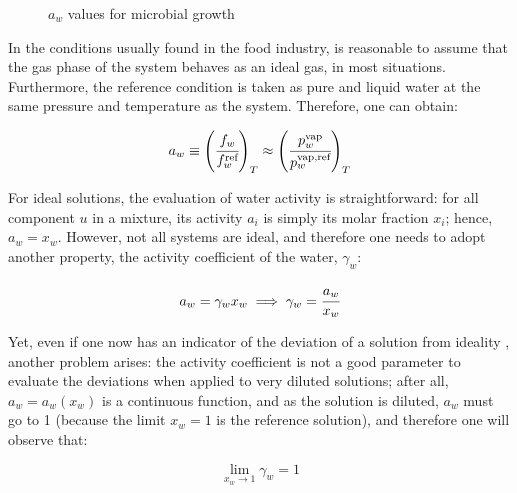 \documentclass[
	12pt,				%
	openright,
	twoside,
	a4paper,			%
	brazil,			%
	french,				%
	english				%
	]{abntex2}
\begin{document}
\begin{figure}[h]
	\caption{$a_w$ values for microbial growth}
	\label{fig:germ}
\end{figure}

In the conditions usually found in the food industry, is reasonable to assume
that the gas phase of the system behaves as an ideal gas\cite{canovas2007},
in most situations. Furthermore, the reference condition is taken as pure and liquid
water at the same pressure and temperature as the system. Therefore, one can obtain:

\begin{equation}
	\label{eq:def_atv}
	a_w \equiv \left(\cfrac{f_w}{f^\text{ref}_w}\right)_T%
		\approx \left(\cfrac{p^\text{vap}_w}{p^\text{vap,ref}_w}\right)_T
\end{equation}

For ideal solutions, the evaluation of water activity is straightforward: for all
component $u$ in a mixture, its activity $a_i$ is simply its molar fraction $x_i$;
hence, $a_w = x_w$. However, not all systems are ideal, and therefore one needs to
adopt another property, the activity coefficient of the water, $\gamma_w$:

\begin{equation}
	a_w = \gamma_wx_w \implies \gamma_w = \cfrac{a_w}{x_w}
\end{equation}

Yet, even if one now has an indicator of the deviation of a solution from
ideality , another problem arises: the activity coefficient is not a good
parameter to evaluate the deviations when applied to very diluted solutions;
after all, $a_w=a_w(x_w)$ is a continuous function, and as the solution is diluted,
$a_w$ must go to 1 (because the limit $x_w=1$ is the reference solution), and
therefore one will observe that:

\begin{equation}
	\lim_{x_w \to 1}\gamma_w = 1
\end{equation}
\end{document}
